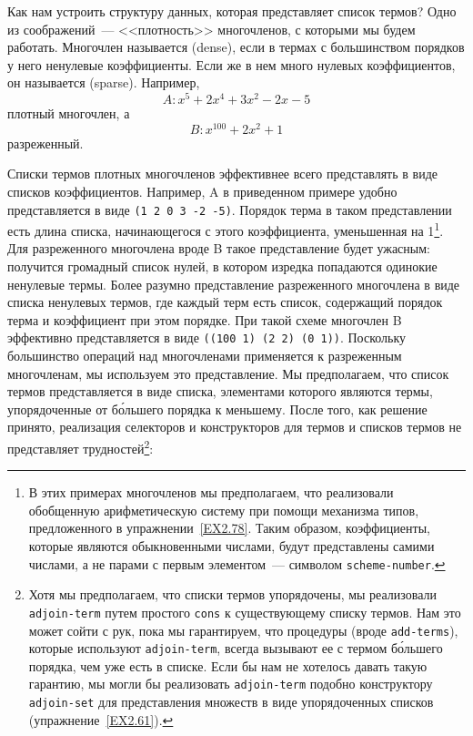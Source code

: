 Как нам устроить структуру данных, которая представляет
список термов?  Одно из соображений~--- <<плотность>> многочленов, с
которыми мы будем работать.  Многочлен называется 
 (dense), если в
термах с большинством порядков у него ненулевые коэффициенты.  Если же
в нем много нулевых коэффициентов, он называется
 (sparse). Например, 
$$
A: x^5 + 2x^4 + 3x^2 - 2x - 5
$$
плотный многочлен, а
$$
B: x^{100} + 2x^2 + 1
$$
разреженный.

Списки термов плотных многочленов эффективнее всего
представлять в виде списков коэффициентов.  Например, A в приведенном
примере удобно представляется в виде {\tt (1 2 0 3 -2 -5)}.
Порядок терма в таком представлении есть длина списка, начинающегося с
этого коэффициента, уменьшенная на 1\footnote{В этих примерах многочленов мы предполагаем, что
реализовали обобщенную арифметическую систему при помощи механизма
типов, предложенного в упражнении~\ref{EX2.78}. Таким
образом, коэффициенты, которые являются обыкновенными числами, будут
представлены самими числами, а не парами с первым элементом~---  символом
{\tt scheme-number}.}.
Для разреженного многочлена вроде B такое представление будет ужасным:
получится громадный список нулей, в котором изредка попадаются
одинокие ненулевые термы.  Более разумно представление разреженного
многочлена в виде списка ненулевых термов, где каждый терм есть
список, содержащий порядок терма и коэффициент при этом порядке.  При
такой схеме многочлен B эффективно представляется в виде 
{\tt ((100 1) (2 2) (0 1))}.  Поскольку большинство операций
над многочленами применяется к разреженным многочленам, мы используем
это представление.  Мы предполагаем, что список термов представляется
в виде списка, элементами которого являются термы, упорядоченные от
б\'{о}льшего порядка к меньшему.  После того, как решение
принято, реализация селекторов и конструкторов для термов и списков
термов не представляет трудностей\footnote{Хотя мы предполагаем, что списки термов упорядочены,
мы реализовали {\tt adjoin-term} путем простого
{\tt cons} к существующему списку термов.  Нам это может сойти с
рук, пока мы гарантируем, что процедуры (вроде
{\tt add-terms}), которые используют {\tt adjoin-term},
всегда вызывают ее с термом б\'{о}льшего порядка, чем уже есть
в списке.  Если бы нам не хотелось давать такую гарантию, мы могли бы
реализовать {\tt adjoin-term} подобно конструктору
{\tt adjoin-set} для представления множеств в виде
упорядоченных списков (упражнение~\ref{EX2.61}).}:


